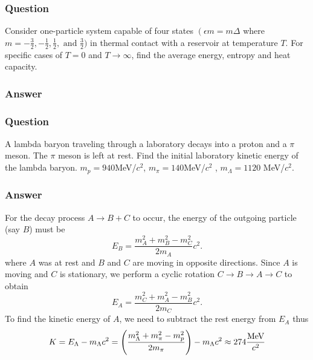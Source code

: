 \subsubsection{Question}
Consider one-particle system capable of four states $\left(\epsilon m = m \Delta\right.$ where $\left.m=-\frac{3}{2},-\frac{1}{2},\frac{1}{2},\text{ and }\frac{3}{2})$ in thermal contact with a reservoir at temperature $T$. For specific cases of $T = 0$ and $T \to \infty$, find the average energy, entropy and heat capacity.
\subsubsection{Answer}

\subsubsection{Question}
A lambda baryon traveling through a laboratory decays into a proton and a $\pi$ meson. The $\pi$ meson is left at rest. Find the initial laboratory kinetic energy of the lambda baryon. $m_p = 940$MeV/$c^2$, $m_{\pi} = 140$MeV/$c^2$ , $m_\Lambda = 1120$ MeV/$c^2$.
\subsubsection{Answer}
For the decay process $A\to B+C$ to occur, the energy of the outgoing particle (say $B$) must be
\begin{equation*}
	E_B = \frac{m_A^2 + m_B^2 - m_C^2}{2m_A} c^2.
\end{equation*}
where $A$ was at rest and $B$ and $C$ are moving in opposite directions. Since $A$ is moving and $C$ is stationary, we perform a cyclic rotation $C\to B\to A\to C$ to obtain
\begin{equation*}
	E_A = \frac{m_C^2+m_A^2-m_B^2}{2m_C} c^2.
\end{equation*}
To find the kinetic energy of $A$, we need to subtract the rest energy from $E_A$ thus
\begin{equation}
	K = E_\Lambda - m_\Lambda c^2 = \qty(\frac{m_{\Lambda}^2+m_{\pi}^2-m_p^2}{2m_\pi}) - m_{\Lambda}c^2 \approx 274\frac{\text{MeV}}{c^2}
\end{equation}
